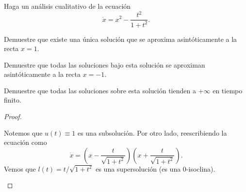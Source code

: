 \documentclass[../pheader.tex]{subfiles}
\begin{document}
\begin{problema}
Haga un análisis cualitativo de la ecuación
\[
    \dot{x} = x^2 - \frac{t^2}{1+t^2}
.\]
\begin{plist}
    \item Demuestre que existe una única solución que se aproxima
    asintóticamente a la recta \(x=1\).

    \item Demuestre que todas las soluciones bajo esta solución se aproximan
    asintóticamente a la recta \(x=-1\).

    \item Demuestre que todas las soluciones sobre esta solución tienden a
    \(+\infty\) en tiempo finito.
\end{plist}
\end{problema}
\begin{proof} \ \\
\begin{plist}
    \item Notemos que \(u(t) \equiv 1\) es una subsolución. Por otro lado,
    reescribiendo la ecuación como
    \[
        \dot{x} =
        \left(x - \frac{t}{\sqrt{1 + t^2}}\right)
        \left(x + \frac{t}{\sqrt{1 + t^2}}\right)
    .\]
    Vemos que \(l(t) = t/\sqrt{1 + t^2}\) es una supersolución (es una
    0-isoclina).
    \begin{center}
    \end{center}

\end{plist}
\end{proof}
\end{document}
